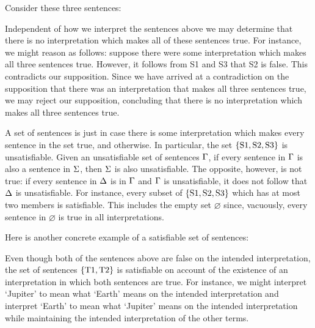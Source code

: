 Consider these three sentences:

\begin{earg}
\end{earg}

Independent of how we interpret the sentences above we may determine that there is no interpretation which makes all of these sentences true. 
For instance, we might reason as follows: suppose there were some interpretation which makes all three sentences true.
However, it follows from S1 and S3 that S2 is false.
This contradicts our supposition.
Since we have arrived at a contradiction on the supposition that there was an interpretation that makes all three sentences true, we may reject our supposition, concluding that there is no interpretation which makes all three sentences true.

A set of sentences is  just in case there is some interpretation which makes every sentence in the set true, and  otherwise.
In particular, the set $\lbrace\text{S1}, \text{S2}, \text{S3}\rbrace$ is unsatisfiable.
Given an unsatisfiable set of sentences $\Gamma$, if every sentence in $\Gamma$ is also a sentence in $\Sigma$, then $\Sigma$ is also unsatisfiable. 
The opposite, however, is not true: if every sentence in $\Delta$ is in $\Gamma$ and $\Gamma$ is unsatisfiable, it does not follow that $\Delta$ is unsatisfiable. 
For instance, every subset of $\lbrace\text{S1}, \text{S2}, \text{S3}\rbrace$ which has at most two members is satisfiable.
This includes the empty set $\varnothing$ since, vacuously, every sentence in $\varnothing$ is true in all interpretations.

Here is another concrete example of a satisfiable set of sentences:

\begin{earg}
\end{earg}

Even though both of the sentences above are false on the intended interpretation, the set of sentences $\lbrace\text{T1}, \text{T2}\rbrace$ is satisfiable on account of the existence of an interpretation in which both sentences are true.
For instance, we might interpret `Jupiter' to mean what `Earth' means on the intended interpretation and interpret `Earth' to mean what `Jupiter' means on the intended interpretation while maintaining the intended interpretation of the other terms.

